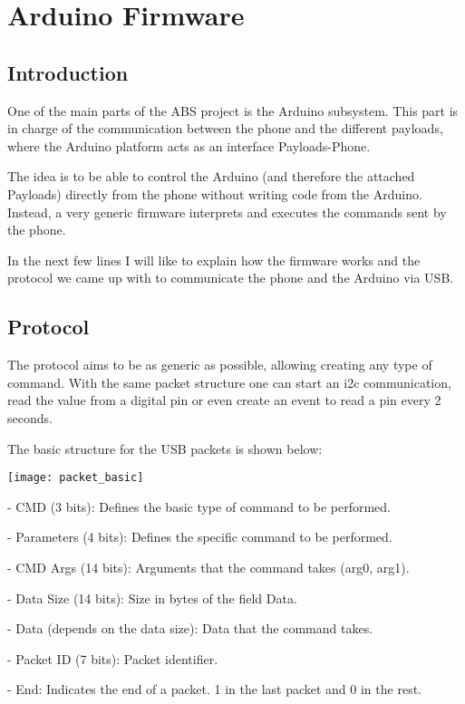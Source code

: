 \documentclass[12pt,a4paper]{report}
\begin{document}
\section*{Arduino Firmware}

\subsection*{Introduction}

One of the main parts of the ABS project is the Arduino subsystem. This part is in charge of the communication between the phone and the different payloads, where the Arduino platform acts as an interface Payloads-Phone.

The idea is to be able to control the Arduino (and therefore the attached Payloads) directly from the phone without writing code from the Arduino. Instead, a very generic firmware interprets and executes the commands sent by the phone.

In the next few lines I will like to explain how the firmware works and the protocol we came up with to communicate the phone and the Arduino via USB.

\subsection*{Protocol}

The protocol aims to be as generic as possible, allowing creating any type of command. With the same packet structure one can start an i2c communication, read the value from a digital pin or even create an event to read a pin every 2 seconds.

The basic structure for the USB packets is shown below:


\texttt{[image: packet\_basic]}

-	CMD (3 bits): Defines the basic type of command to be performed.

-	Parameters (4 bits): Defines the specific command to be performed.

-	CMD Args (14 bits): Arguments that the command takes (arg0, arg1).

-	Data Size (14 bits): Size in bytes of the field Data.

-	Data (depends on the data size): Data that the command takes.

-	Packet ID (7 bits): Packet identifier.

-	End: Indicates the end of a packet. 1 in the last packet and 0 in the rest.
\end{document}
